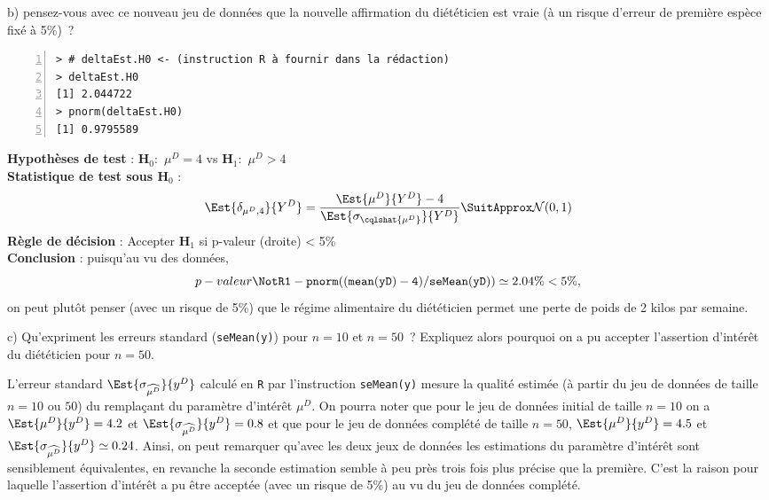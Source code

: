 \documentclass[10pt]{report}
\begin{document}
\begin{exercice}
b) pensez-vous avec ce nouveau jeu de donn{\'e}es que la nouvelle affirmation du di{\'e}t{\'e}ticien est vraie ({\`a} un risque d'erreur de premi{\`e}re esp{\`e}ce fix{\'e} {\`a} 5\%)~?

\IndicR
\begin{Verbatim}[frame=leftline,fontfamily=tt,fontshape=n,numbers=left]
> # deltaEst.H0 <- (instruction R à fournir dans la rédaction)
> deltaEst.H0
[1] 2.044722
> pnorm(deltaEst.H0)
[1] 0.9795589
\end{Verbatim}


\begin{Correction}

\noindent \textbf{Hypothèses de test} : $\mathbf{H}_0:$ $\mu^{D}=4$ vs {\large $\mathbf{H}_1:$ $\mu^{D}>4$}\\
\textbf{Statistique de test sous $\mathbf{H}_0$} :
  $$
  \Est{\delta_{\mu^{D},4}}{Y^{D}}= {\displaystyle \frac{\Est{\mu^{D}}{Y^{D}}-4}{
\Est{\sigma_{\cqlshat{\mu^{D}}}}{Y^{D}}
}} 
  \SuitApprox \mathcal{N}(0,1)
  $$
\textbf{Règle de décision} : Accepter $\mathbf{H}_1$ si 
  p-valeur (droite) < 5\%\\
\noindent \textbf{Conclusion} :
puisqu'au vu des données, 
  \[
p-valeur\NotR\mathtt{1-pnorm((mean(yD)-4)/seMean(yD))} \simeq 2.04\% < 5\%,
\]
on peut plutôt penser (avec un risque de 5\%) que le régime alimentaire du diététicien permet une perte de poids de 2 kilos par semaine.
\end{Correction}



c) Qu'expriment les erreurs standard (\texttt{seMean(y)}) pour $n=10$ et $n=50$~? Expliquez alors pourquoi on a pu accepter l'assertion d'intérêt du diététicien pour $n=50$.


\begin{Correction}
L'erreur standard $\Est{\sigma_{\widehat{\mu^D}}}{y^D}$ calculé en \texttt{R} par l'instruction \texttt{seMean(y)} mesure la qualité estimée (à partir du jeu de données de taille $n=10$ ou $50$) du remplaçant du paramètre d'intérêt $\mu^D$. On pourra noter que pour le jeu de données initial de taille $n=10$ on a $\Est{\mu^D}{y^D} =4.2$ et $\Est{\sigma_{\widehat{\mu^D}}}{y^D}=0.8$ et que pour le jeu de données complété de taille $n=50$, $\Est{\mu^D}{y^D} =4.5$ et $\Est{\sigma_{\widehat{\mu^D}}}{y^D}\simeq 0.24$. Ainsi, on peut remarquer qu'avec les deux jeux de données les estimations du paramètre d'intérêt sont sensiblement équivalentes, en revanche la seconde estimation semble à peu près trois fois plus précise que la première. C'est la raison pour laquelle l'assertion d'intérêt a pu être acceptée (avec un risque de 5\%) au vu du jeu de données complété.
\end{Correction}

\end{exercice}
\end{document}
